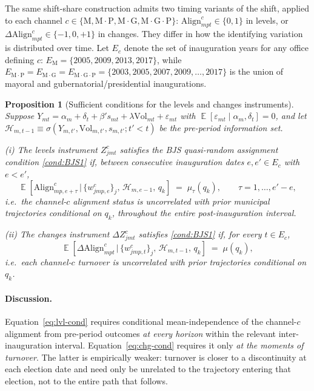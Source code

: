 \documentclass{article}
\newcommand{\Align}{\mathrm{Align}}
\newcommand{\Vol}{\mathrm{Vol}}
\DeclareMathOperator{\E}{\mathbb{E}}
\theoremstyle{plain}
\newtheorem{proposition}{Proposition}
\theoremstyle{definition}
\theoremstyle{remark}
\begin{document}
The same shift-share construction admits two timing variants of the
shift, applied to each channel
$c\in\{\mathrm{M},\mathrm{M{\cdot}P},\mathrm{M{\cdot}G},\mathrm{M{\cdot}G{\cdot}P}\}$:
$\Align^{c}_{mpt}\in\{0,1\}$ in levels, or
$\Delta\Align^{c}_{mpt}\in\{-1,0,+1\}$ in changes. They differ in how the
identifying variation is distributed over time. Let $E_c$ denote the set
of inauguration years for any office defining $c$:
$E_{\mathrm{M}}=\{2005,2009,2013,2017\}$, while
$E_{\mathrm{M{\cdot}P}}=E_{\mathrm{M{\cdot}G}}=
E_{\mathrm{M{\cdot}G{\cdot}P}}=\{2003,2005,2007,2009,\ldots,2017\}$ is
the union of mayoral and gubernatorial/presidential inaugurations.

\begin{proposition}[Sufficient conditions for the levels and changes
instruments]\label{prop:lvlchg}
Suppose $Y_{mt}=\alpha_m+\delta_t+\beta' s_{mt}+\lambda\Vol_{mt}+\varepsilon_{mt}$
with $\E[\varepsilon_{mt}\mid \alpha_m,\delta_t]=0$, and let
$\mathcal{H}_{m,t-1}\equiv\sigma(Y_{m,t'},\Vol_{m,t'},s_{m,t'};t'<t)$ be the
pre-period information set.

(i) The \emph{levels} instrument $Z^{c}_{jmt}$ satisfies the BJS
quasi-random assignment condition \autoref{cond:BJS1} if, between
consecutive inauguration dates $e,e'\in E_c$ with $e<e'$,
\begin{equation}\label{eq:lvl-cond}
  \E\!\left[\Align^{c}_{mp,e+\tau}\,\big|\,
    \{w^{c}_{jmp,e}\}_{j},\,\mathcal{H}_{m,e-1},\, q_{k}\right]
  \;=\;
  \mu_\tau(q_k),
  \qquad \tau=1,\dots,e'-e,
\end{equation}
i.e.\ the channel-$c$ alignment status is uncorrelated with prior
municipal trajectories conditional on $q_k$, throughout the entire
post-inauguration interval.

(ii) The \emph{changes} instrument $\Delta Z^{c}_{jmt}$ satisfies
\autoref{cond:BJS1} if, for every $t\in E_c$,
\begin{equation}\label{eq:chg-cond}
  \E\!\left[\Delta\Align^{c}_{mpt}\,\big|\,
    \{w^{c}_{jmp,t}\}_{j},\,\mathcal{H}_{m,t-1},\, q_{k}\right]
  \;=\;
  \mu(q_k),
\end{equation}
i.e.\ each channel-$c$ turnover is uncorrelated with prior trajectories
conditional on $q_k$.
\end{proposition}

\paragraph{Discussion.}
Equation~\eqref{eq:lvl-cond} requires conditional mean-independence of
the channel-$c$ alignment from pre-period outcomes \emph{at every horizon}
within the relevant inter-inauguration interval.
Equation~\eqref{eq:chg-cond} requires it only \emph{at the moments of
turnover}. The latter is empirically weaker: turnover is closer to a
discontinuity at each election date and need only be unrelated to the
trajectory entering that election, not to the entire path that follows.
\end{document}
